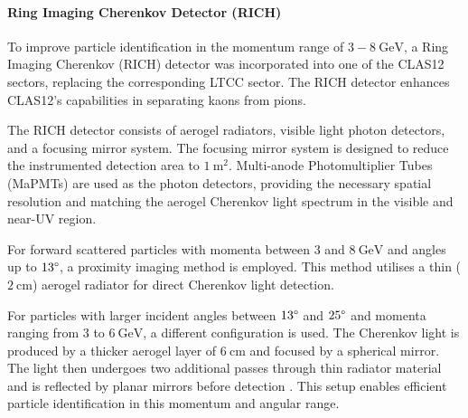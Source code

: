 \paragraph{Ring Imaging Cherenkov Detector (RICH)}
\label{par::rich}
    To improve particle identification in the momentum range of $3 - 8 ~\text{GeV}$, a Ring Imaging Cherenkov (RICH) detector was incorporated into one of the CLAS12 sectors, replacing the corresponding LTCC sector.
    The RICH detector enhances CLAS12's capabilities in separating kaons from pions.

    The RICH detector consists of aerogel radiators, visible light photon detectors, and a focusing mirror system.
    The focusing mirror system is designed to reduce the instrumented detection area to $1 ~\text{m}^2$.
    Multi-anode Photomultiplier Tubes (MaPMTs) are used as the photon detectors, providing the necessary spatial resolution and matching the aerogel Cherenkov light spectrum in the visible and near-UV region.

    For forward scattered particles with momenta between $3$ and $8 ~\text{GeV}$ and angles up to $13\degree$, a proximity imaging method is employed.
    This method utilises a thin ($2 ~\text{cm}$) aerogel radiator for direct Cherenkov light detection.

    For particles with larger incident angles between $13\degree$ and $25\degree$ and momenta ranging from $3$ to $6 ~\text{GeV}$, a different configuration is used.
    The Cherenkov light is produced by a thicker aerogel layer of $6 ~\text{cm}$ and focused by a spherical mirror.
    The light then undergoes two additional passes through thin radiator material and is reflected by planar mirrors before detection \cite{contalbrigo2020}.
    This setup enables efficient particle identification in this momentum and angular range.
